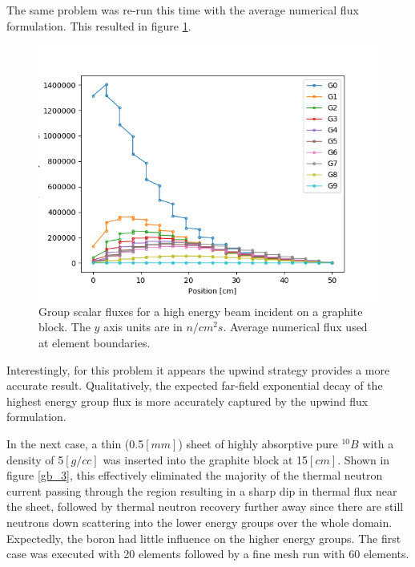 The same problem was re-run this time with the average numerical flux formulation.  This resulted in figure \ref{gb_2}.

\begin{figure}[!htbp]
\centering
\includegraphics[width=12cm]{results/scflux_graphite_beam_2.png}
\caption{Group scalar fluxes for a high energy beam incident on a graphite block. The $y$ axis units are in $n/cm^2s$.  Average numerical flux used at element boundaries.}
\label{gb_2}
\end{figure}
Interestingly, for this problem it appears the upwind strategy provides a more accurate result. Qualitatively, the expected far-field exponential decay of the highest energy group flux is more accurately captured by the upwind flux formulation.

In the next case, a thin (0.5$[mm]$) sheet of highly absorptive pure $^{10}B$ with a density of 5$[g/cc]$ was inserted into the graphite block at 15$[cm]$.  Shown in figure \ref{gb_3}, this effectively eliminated the majority of the thermal neutron current passing through the region resulting in a sharp dip in thermal flux near the sheet, followed by thermal neutron recovery further away since there are still neutrons down scattering into the lower energy groups over the whole domain. Expectedly, the boron had little influence on the higher energy groups.  The first case was executed with 20 elements followed by a fine mesh run with 60 elements.

